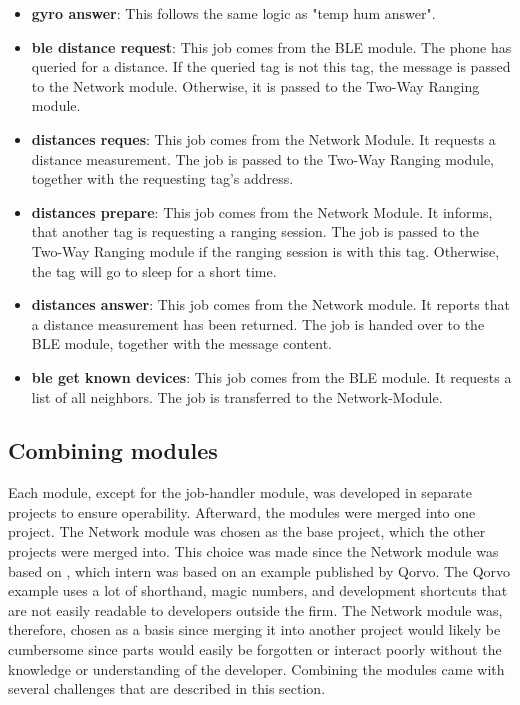 \begin{itemize}
  \item \textbf{gyro answer}: This follows the same logic as "temp hum answer".
  \item \textbf{ble distance request}: This job comes from the BLE module. The phone has queried for a distance. If the queried tag is not this tag, the message is passed to the Network module. Otherwise, it is passed to the Two-Way Ranging module.
  \item \textbf{distances reques}: This job comes from the Network Module. It requests a distance measurement. The job is passed to the Two-Way Ranging module, together with the requesting tag's address.
  \item \textbf{distances prepare}: This job comes from the Network Module. It informs, that another tag is requesting a ranging session. The job is passed to the Two-Way Ranging module if the ranging session is with this tag. Otherwise, the tag will go to sleep for a short time.
  \item \textbf{distances answer}: This job comes from the Network module. It reports that a distance measurement has been returned. The job is handed over to the BLE module, together with the message content.
  \item \textbf{ble get known devices}: This job comes from the BLE module. It requests a list of all neighbors. The job is transferred to the Network-Module.
\end{itemize}


\subsection{Combining modules}
\label{ss:combination}
Each module, except for the job-handler module, was developed in separate projects to ensure operability.
Afterward, the modules were merged into one project.
The Network module was chosen as the base project, which the other projects were merged into.
This choice was made since the Network module was based on \cite{degkwitz2023ultrawideband}, which intern was based on an example published by Qorvo.
The Qorvo example uses a lot of shorthand, magic numbers, and development shortcuts that are not easily readable to developers outside the firm.
The Network module was, therefore, chosen as a basis since merging it into another project would likely be cumbersome since parts would easily be forgotten or interact poorly without the knowledge or understanding of the developer.
Combining the modules came with several challenges that are described in this section.


